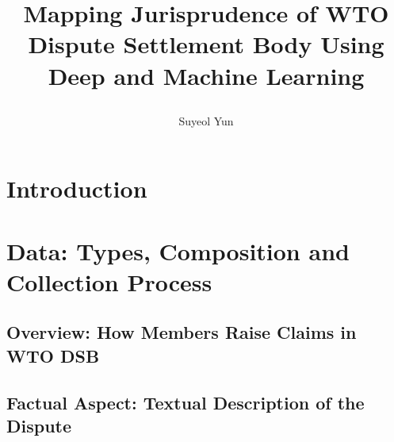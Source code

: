 \documentclass[12pt,letterpaper]{article}
\newcommand{\tit}{
\bf 
Mapping Jurisprudence of WTO Dispute Settlement Body Using Deep and Machine Learning
}
\newcommand\spacingset[1]{\renewcommand{\baselinestretch}
{#1}\small\normalsize}
\begin{document}
\spacingset{1.25}

\setcounter{page}{0}
\vspace{-.1in}

{\title{
    \tit
  }
  \author{Suyeol Yun
  }
  \maketitle
}

\thispagestyle{empty}
\vspace{-.1in}

\begin{abstract}
  
\end{abstract}

\spacingset{1.5} %

% 

\section{Introduction}










\section{Data: Types, Composition and Collection Process} \label{sec:data}


\subsection{Overview: How Members Raise Claims in WTO DSB}


\subsection{Factual Aspect: Textual Description of the Dispute}

\end{document}
